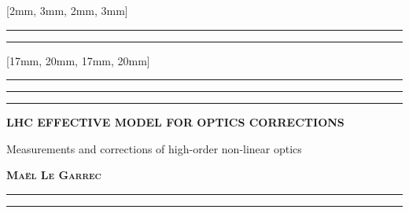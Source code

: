 \documentclass[coverheight=240mm,
               coverwidth=175mm, 
               spinewidth=15mm,
               markcolor=black,
               bleedwidth=0mm,
               marklength=0mm]{bookcover}
\begin{document}
    
\begin{bookcover}

\setmainfont{TeX Gyre Adventor}


\color{textcolor}


[2mm, 3mm, 2mm, 3mm]{
    \noindent\rule[0.5em]{\partwidth}{1.5pt}
    \vfill
    \vfill
    \noindent\rule[0.5em]{\partwidth}{1.5pt}
}


[17mm, 20mm, 17mm, 20mm] %
{
    \noindent\rule[0.5em]{\partwidth}{1.5pt}\vspace{-4pt}
    \noindent\rule[0.5em]{\partwidth}{1.5pt}\vspace{-4pt}
    \noindent\rule[0.5em]{\partwidth}{1.5pt}
    \vspace{1.5cm}
    \begin{flushright}%
        \fontsize{35pt}{36pt}\selectfont%
        \bfseries
        \MakeUppercase{
            LHC Effective Model for Optics Corrections
        }%
    \end{flushright}
    \vspace{.1em}
    \fontsize{11pt}{15pt}\selectfont%
    \begin{flushright}%
        Measurements and corrections of high-order non-linear optics
    \end{flushright}
    \vfill
    \fontsize{15pt}{0pt}\selectfont%
    \bfseries\noindent\scshape Maël Le Garrec
    \par
    \vspace{0.3em}
    \noindent\rule[0.5em]{\partwidth}{1.5pt}\vspace{-2pt}
    \noindent\rule[0.5em]{\partwidth}{1.5pt}
}



\end{bookcover}
\end{document}
